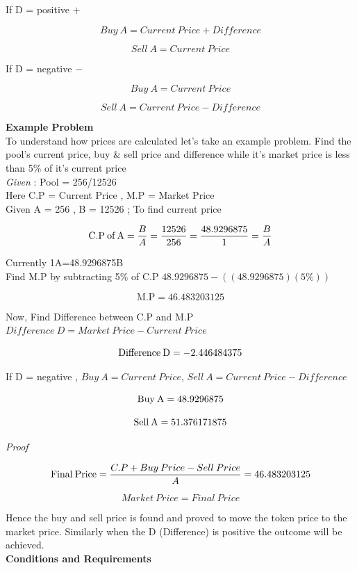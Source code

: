 \documentclass[letterpaper,11pt]{article}
\begin{document}
If D = positive $+$

\[Buy\:A=Current\:Price+Difference\]

\[Sell\:A=Current\:Price\]

If D = negative $-$

\[Buy\:A=Current\:Price\]

\[Sell\:A=Current\:Price-Difference\]



\textbf{Example Problem}\\

To understand how prices are calculated let's take an example problem. Find the pool's current price, buy \& sell price and difference while it's market price is less than 5\% of it's current price\\

\textit{Given} : Pool = 256/12526\\

Here C.P = Current Price , M.P = Market Price\\

Given A = 256 , B = 12526 ;
To find current price 

\[\text{C.P\:of\:A}=\frac{B}{A}=\frac{12526}{256}=\frac{48.9296875}{1}=\frac{B}{A}\]


Currently 1A=48.9296875B\\

Find M.P by subtracting 5\% of C.P $48.9296875 - ((48.9296875)(5\%))$ 

\[\text{M.P} = 46.483203125\]

Now, Find Difference between C.P and M.P $Difference\:D = Market\:Price - Current\:Price$

\[\text{Difference\:D} = -2.446484375\]

If D = negative , $Buy\:A=Current\:Price$, $Sell\:A=Current\:Price-Difference$

\[\text{Buy\:A} = 48.9296875\]

\[\text{Sell\:A} = 51.376171875\]

\textit{Proof}

\[\text{Final\:Price}=\frac{C.P+Buy\:Price - Sell\:Price}{A} = 46.483203125\]

\[Market\:Price=Final\:Price\]

Hence the buy and sell price is found and proved to move the token price to the market price. Similarly when the D (Difference) is positive the outcome will be achieved. \\


\textbf{Conditions and Requirements}\\
\end{document}
